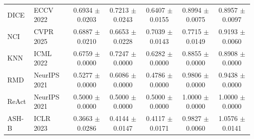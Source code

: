 \begin{table}[t]
{\begin{tabular}{llccccc}
DICE & ECCV 2022 & 0.6934 $\pm$ 0.0203 & 0.7213 $\pm$ 0.0243 & 0.6407 $\pm$ 0.0155 & 0.8994 $\pm$ 0.0075 & 0.8957 $\pm$ 0.0097 \\
NCI & CVPR 2025 & 0.6887 $\pm$ 0.0210 & 0.6653 $\pm$ 0.0228 & 0.7039 $\pm$ 0.0143 & 0.7715 $\pm$ 0.0149 & 0.9193 $\pm$ 0.0060 \\
KNN & ICML 2022 & 0.6759 $\pm$ 0.0000 & 0.7247 $\pm$ 0.0000 & 0.6282 $\pm$ 0.0000 & 0.8855 $\pm$ 0.0000 & 0.8908 $\pm$ 0.0000 \\
RMD & NeurIPS 2021 & 0.5277 $\pm$ 0.0000 & 0.6086 $\pm$ 0.0000 & 0.4786 $\pm$ 0.0000 & 0.9806 $\pm$ 0.0000 & 0.9438 $\pm$ 0.0000 \\
ReAct & NeurIPS 2021 & 0.5000 $\pm$ 0.0000 & 0.5000 $\pm$ 0.0000 & 0.5000 $\pm$ 0.0000 & 1.0000 $\pm$ 0.0000 & 1.0000 $\pm$ 0.0000 \\
ASH-B & ICLR 2023 & 0.3663 $\pm$ 0.0286 & 0.4144 $\pm$ 0.0147 & 0.4117 $\pm$ 0.0171 & 0.9827 $\pm$ 0.0060 & 1.0576 $\pm$ 0.0141 \\
\bottomrule
\end{tabular}%
}
\end{table}


